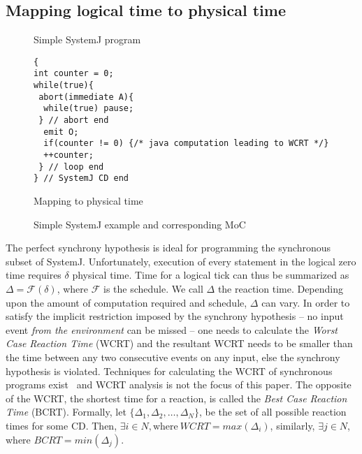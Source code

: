 \subsection{Mapping logical time to physical time}
\label{sec:mapping-logical-time}

\begin{figure}[t!]
\centering
\begin{SubFloat}{\label{fig:2a}Simple SystemJ program}%
\begin{minipage}[b]{1\linewidth}%
		\begin{lstlisting}[style=sysj,morekeywords={abort,await,emit,present,trap,pause,exit,delay,suspend}]
{
int counter = 0;
while(true){
 abort(immediate A){
  while(true) pause; 
 } // abort end
  emit O;
  if(counter != 0) {/* java computation leading to WCRT */}
  ++counter;
 } // loop end
} // SystemJ CD end
\end{lstlisting}%
\end{minipage}%
\end{SubFloat}

\begin{SubFloat}{\label{fig:2c}Mapping to physical time}%
\scalebox{0.68}{}
\end{SubFloat}%
\caption{Simple SystemJ example and corresponding MoC}
\label{fig:2}
\end{figure}

The perfect synchrony hypothesis is ideal for programming the
synchronous subset of SystemJ. Unfortunately, execution of every
statement in the logical zero time requires $\delta$ physical time. Time
for a logical tick can thus be summarized as $\Delta = \mathcal{F}
(\delta)$, where $\mathcal{F}$ is the schedule. We call $\Delta$ the
reaction time. Depending upon the amount of computation required and
schedule, $\Delta$ can vary. In order to satisfy the implicit
restriction imposed by the synchrony hypothesis -- no input event
\textit{from the environment} can be missed -- one needs to calculate
the \textit{Worst Case Reaction Time} (WCRT) and the resultant WCRT
needs to be smaller than the time between any two consecutive events on
any input, else the synchrony hypothesis is violated. Techniques for
calculating the WCRT of synchronous programs exist~\cite{boldt07} and
WCRT analysis is not the focus of this paper. The opposite of the WCRT,
the shortest time for a reaction, is called the \textit{Best Case
  Reaction Time} (BCRT). Formally, let $\{\Delta_1, \Delta_2,\ldots,
\Delta_N\}$, be the set of all possible reaction times for some
CD. Then, $\exists i \in N, \mathrm{where\ } WCRT= max (\Delta_i)$,
similarly, $\exists j \in N$, where $BCRT = min (\Delta_j)$.


